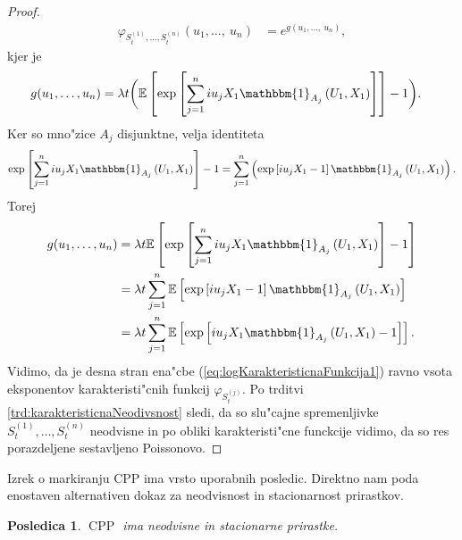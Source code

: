 \documentclass[12pt, a4paper, reqno]{amsart}
\theoremstyle{definition}
\theoremstyle{plain}
\newtheorem{posledica}[definicija]{Posledica}
\newcommand{\E}{\mathbb{E}}
\newcommand{\1}{\mathds{1}}
\DeclareMathOperator{\CPP}{CPP}
\newcommand*{\refPriloga}[1]{%
  \begingroup
    \hypersetup{
      linkcolor=red,
      linkbordercolor=red,
    }%
    \ref{#1}%
  \endgroup
}
\begin{document}
\begin{proof}
            \begin{align*}
                    \varphi_{S_t^{(1)},\dots, S_t^{(n)}}(u_1, \dots, \ u_n) &= e^{g(u_1, \dots, \ u_n)},
            \end{align*}
            kjer je
            \begin{align}
                    g(u_1, \dots, u_n) &= \lambda t \biggl(\E\left[\exp\left[\sum_{j = 1}^niu_jX_1\mathbbm{1}_{A_j}\left(U_1, X_1\right)\right]\right] - 1\biggr). \label{eq:logKarakteristicnaFunkcija1}
            \end{align}
            Ker so mno"zice $A_j$ disjunktne, velja identiteta
            \begin{equation*}
                \exp\left[\sum_{j = 1}^niu_jX_1\mathbbm{1}_{A_j}\left(U_1, X_1\right)\right] - 1 
                = \sum_{j=1}^n\left(\exp\left[iu_jX_1 - 1\right]\mathbbm{1}_{A_j}\left(U_1, X_1\right)\right).
            \end{equation*}
            Torej 
            \begin{align*}
                g(u_1, \dots, u_n) &=
                \lambda t\E\left[\exp\left[\sum_{j = 1}^niu_jX_1\mathbbm{1}_{A_j}\left(U_1, X_1\right)\right] - 1 \right] \\
                &= \lambda t\sum_{j=1}^n\E\left[\exp\left[iu_jX_1 - 1\right]\mathbbm{1}_{A_j}\left(U_1, X_1\right)\right] \\
                &= \lambda t\sum_{j=1}^n\E\left[\exp\left[iu_jX_1\mathbbm{1}_{A_j}\left(U_1, X_1\right) - 1\right]\right].
            \end{align*}
            Vidimo, da je desna stran ena"cbe (\ref{eq:logKarakteristicnaFunkcija1}) ravno vsota 
            eksponentov karakteristi"cnih funkcij $\varphi_{S_t^{(j)}}$. 
            Po trditvi \refPriloga{trd:karakteristicnaNeodivsnost} sledi, da so slu"cajne 
            spremenljivke $S_t^{(1)}, \dots, S_t^{(n)}$ neodvisne 
            in po obliki karakteristi"cne 
            funckcije vidimo, da so res porazdeljene sestavljeno Poissonovo.
        \end{proof}

        Izrek o markiranju CPP ima vrsto uporabnih posledic. Direktno nam poda enostaven
        alternativen dokaz za neodvisnost in stacionarnost prirastkov.

        \begin{posledica}
            $\CPP$ ima neodvisne in stacionarne prirastke.
        \end{posledica}
\end{document}
